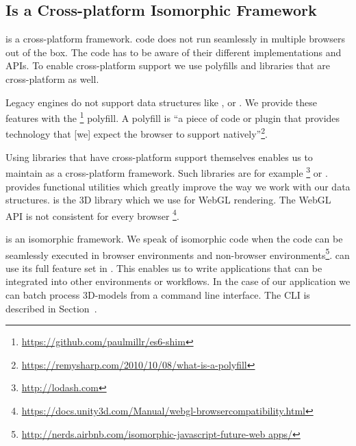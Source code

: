 \documentclass[../../ClassicThesis.tex]{subfiles}
\begin{document}


\subsection{{\convertify} Is a Cross-platform Isomorphic Framework}
\label{sec:convertify-is-isomorphic}

{\convertify} is a cross-platform framework. {\javascript}
code does not run seamlessly in multiple browsers out of the
box. The code has to be aware of their different
implementations and APIs.
To enable cross-platform {\javascript} support we use
polyfills and libraries that are cross-platform as well.

Legacy {\javascript} engines do not support data structures
like ,  or . We provide
these features with the
\footnote{\url{https://github.com/paulmillr/es6-shim}}
polyfill. A polyfill is \enquote{a piece of code or plugin
  that provides technology that [we] expect the browser to
  support
  natively}\footnote{\url{https://remysharp.com/2010/10/08/what-is-a-polyfill}}.

Using libraries that have cross-platform support themselves enables us
to maintain {\convertify} as a cross-platform framework. Such
libraries are for example
\footnote{\url{http://lodash.com}} or {\threejs}.
 provides functional utilities which greatly improve the
way we work with our data structures. {\threejs} is the 3D library
which we use for WebGL rendering. The WebGL API is not consistent for every browser
\footnote{\url{https://docs.unity3d.com/Manual/webgl-browsercompatibility.html}}.


{\convertify} is an isomorphic framework. We speak of
isomorphic {\javascript} code when the code can be
seamlessly executed in browser environments and non-browser
environments\footnote{\url{http://nerds.airbnb.com/isomorphic-javascript-future-web
    apps/}}.
{\convertify} can use its full feature set in {\nodejs}.
This enables us to write applications that can be integrated
into other environments or workflows. In the case of our
application {\platener} we can batch process 3D-models from
a command line interface. The CLI is described in
Section~.
\end{document}
